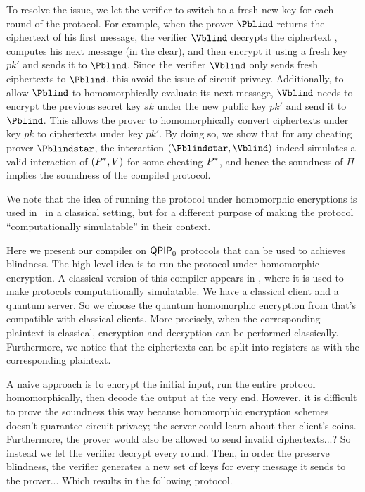 To resolve the issue, we let the verifier to switch to a fresh new key for each round of the protocol. For example, when the prover $\Pblind$ returns the ciphertext of his first message, the verifier $\Vblind$ decrypts the ciphertext , computes his next message (in the clear), and then encrypt it using a fresh key $pk'$ and sends it to $\Pblind$. Since the verifier $\Vblind$ only  sends fresh ciphertexts to $\Pblind$, this avoid the issue of circuit privacy. Additionally, to allow $\Pblind$ to homomorphically evaluate its next message, $\Vblind$ needs to encrypt the previous secret key $sk$ under the new public key $pk'$ and send it to $\Pblind$. This allows the prover to homomorphically convert ciphertexts under key $pk$ to ciphertexts under key $pk'$. By doing so, we show that for any cheating prover $\Pblindstar$, the interaction $(\Pblindstar, \Vblind)$ indeed simulates a valid interaction of $(P^*, V)$ for some cheating $P^*$, and hence the soundness of $\Pi$ implies the soundness of the compiled protocol. 

We note that the idea of running the protocol under homomorphic encryptions is used in~\cite{KMThesis} in a classical setting, but for a different purpose of making the protocol ``computationally simulatable'' in their context.

\iffalse
 

Here we present our compiler on $\operatorname{\mathsf{QPIP}}_0$ protocols that can be used to achieves blindness.
The high level idea is to run the protocol under homomorphic encryption.
A classical version of this compiler appears in \cite{KMThesis}, where it is used to make protocols computationally simulatable.
We have a classical client and a quantum server.
So we choose the quantum homomorphic encryption from \cite{mahadev_qfhe} that's compatible with classical clients.
More precisely, when the corresponding plaintext is classical, encryption and decryption can be performed classically.
Furthermore, we notice that the ciphertexts can be split into registers as with the corresponding plaintext.

A naive approach is to encrypt the initial input,
run the entire protocol homomorphically,
then decode the output at the very end.
However, it is difficult to prove the soundness this way because homomorphic encryption schemes doesn't guarantee circuit privacy;
the server could learn about ther client's coins.
Furthermore, the prover would also be allowed to send invalid ciphertexts...?
So instead we let the verifier decrypt every round.
Then, in order the preserve blindness, the verifier generates a new set of keys for every message it sends to the prover...
Which results in the following protocol.

